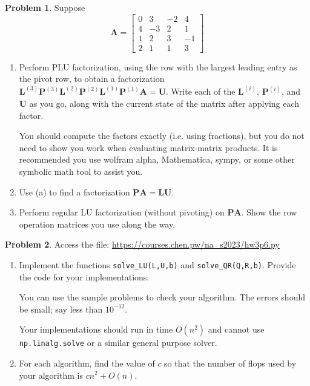 \documentclass[12pt]{article}
\theoremstyle{definition}
\newtheorem{problem}{Problem}
\renewcommand{\vec}{\mathbf}
\begin{document}
\begin{problem}
Suppose
    \[
        \vec{A} 
        = 
        \begin{bmatrix}
            0 & 3 & -2 & 4 \\
            4 & -3 & 2 & 1 \\
            1 & 2 & 3 & -1 \\
            2 & 1 & 1& 3
        \end{bmatrix}
    \]

    \begin{enumerate}
        \item Perform PLU factorization, using the row with the largest leading entry as the pivot row, to obtain a factorization $\vec{L}^{(3)} \vec{P}^{(3)} \vec{L}^{(2)} \vec{P}^{(2)} \vec{L}^{(1)} \vec{P}^{(1)} \vec{A} = \vec{U}$.
        Write each of the $\vec{L}^{(i)}$, $\vec{P}^{(i)}$, and $\vec{U}$ as you go, along with the current state of the matrix after applying each factor.
            
            You should compute the factors exactly (i.e. using fractions), but you do not need to show you work when evaluating matrix-matrix products. It is recommended you use wolfram alpha, Mathematica, sympy, or some other symbolic math tool to assist you.  
        \item Use (a) to find a factorization $\vec{P}\vec{A}  = \vec{L} \vec{U}$.
        \item Perform regular LU factorization (without pivoting) on $\vec{P}\vec{A}$.
            Show the row operation matrices you use along the way.
    \end{enumerate}
\end{problem}

\clearpage
\begin{problem}

    Access the file: \url{https://courses.chen.pw/na_s2023/hw3p6.py}
    
    \begin{enumerate}
        \item Implement the functions \lstinline{solve_LU(L,U,b)} and \lstinline{solve_QR(Q,R,b)}.
            Provide the code for your implementations.

            You can use the sample problems to check your algorithm. The errors should be small; say less than $10^{-12}$.
        
            Your implementations should run in time $O(n^2)$ and cannot use \lstinline{np.linalg.solve} or a similar general purpose solver.

        \item For each algorithm, find the value of $c$ so that the number of flops used by your algorithm is $c n^2 + O(n)$. 
    \end{enumerate}
            

\end{problem}
\end{document}
